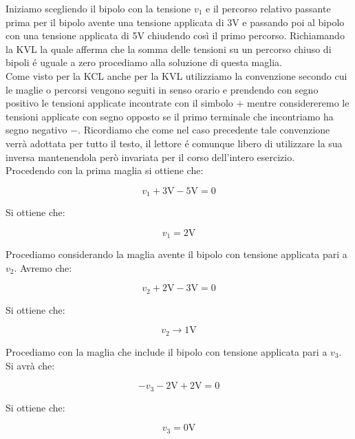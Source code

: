 \documentclass[../main.tex]{subfiles}
\begin{document}
Iniziamo scegliendo il bipolo con la tensione $v_1$ e il percorso relativo passante prima per il bipolo avente una tensione applicata di 3V e passando poi al bipolo con una tensione applicata di 5V chiudendo così il primo percorso.
Richiamando la KVL la quale afferma che la somma delle tensioni su un percorso chiuso di bipoli é uguale a zero procediamo alla soluzione di questa maglia.\\

Come visto per la KCL anche per la KVL utilizziamo la convenzione secondo cui le maglie o percorsi vengono seguiti in senso orario e prendendo con segno positivo le tensioni applicate incontrate con il simbolo $+$ mentre considereremo le tensioni applicate con segno opposto se il primo terminale che incontriamo ha segno negativo $-$. Ricordiamo che come nel caso precedente tale convenzione verrà adottata per tutto il testo, il lettore é comunque libero di utilizzare la sua inversa mantenendola però invariata per il corso dell'intero esercizio.\\

Procedendo con la prima maglia si ottiene che:

\begin{equation}
	v_1 + \text{3V} - \text{5V} = 0
\end{equation}

Si ottiene che:

\begin{equation}
	v_1 = \text{2V}
\end{equation}

Procediamo considerando la maglia avente il bipolo con tensione applicata pari a $v_2$. Avremo che:

\begin{equation}
	v_2 + \text{2V} - \text{3V} = 0
\end{equation}

Si ottiene che:

\begin{equation}
	v_2 \longrightarrow \text{1V}
\end{equation}

Procediamo con la maglia che include il bipolo con tensione applicata pari a $v_3$. Si avrà che:

\begin{equation}
	-v_3 - \text{2V} + \text{2V} = 0
\end{equation}

Si ottiene che:

\begin{equation}
	v_3 = \text{0V}
\end{equation}
\end{document}
